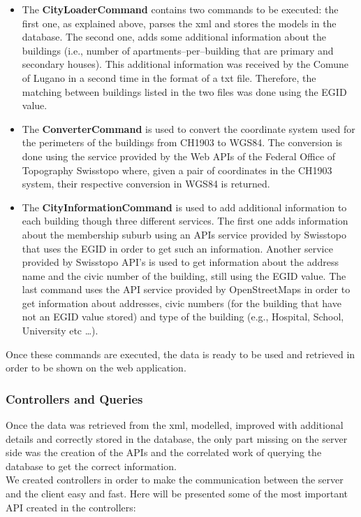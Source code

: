 \begin{itemize}
	\item The {\bf CityLoaderCommand} contains two commands to be executed: the first one, as explained above, parses the xml and stores the models in the database. The second one, adds some additional information about the buildings (i.e., number of apartments--per--building that are primary and secondary houses). This additional information was received by the Comune of Lugano in a second time in the format of a txt file. Therefore, the matching between buildings listed in the two files was done using the EGID value. 
	\item The {\bf ConverterCommand} is used to convert the coordinate system used for the perimeters of the buildings from CH1903 to WGS84. The conversion is done using the service provided by the Web APIs of the Federal Office of Topography Swisstopo  where, given a pair of coordinates in the CH1903 system, their respective conversion in WGS84 is returned.
	\item The {\bf CityInformationCommand} is used to add additional information to each building though three different services. The first one adds information about the membership suburb using an APIs service provided by Swisstopo that uses the EGID in order to get such an information. Another service provided by Swisstopo API's is used to get information about the address name and the civic number of the building, still using the EGID value. The last command uses the API service provided by OpenStreetMaps in order to get information about addresses, civic numbers (for the building that have not an EGID value stored) and type of the building (e.g., Hospital, School, University etc \dots).  
\end{itemize}
Once these commands are executed, the data is ready to be used and retrieved in order to be shown on the web application.
\subsubsection{Controllers and Queries}
Once the data was retrieved from the xml, modelled, improved with additional details and correctly stored in the database, the only part missing on the server side was the creation of the APIs and the correlated work of querying the database to get the correct information.\\

We created controllers in order to make the communication between the server and the client easy and fast. Here will be presented some of the most important API created in the controllers:\\
 
